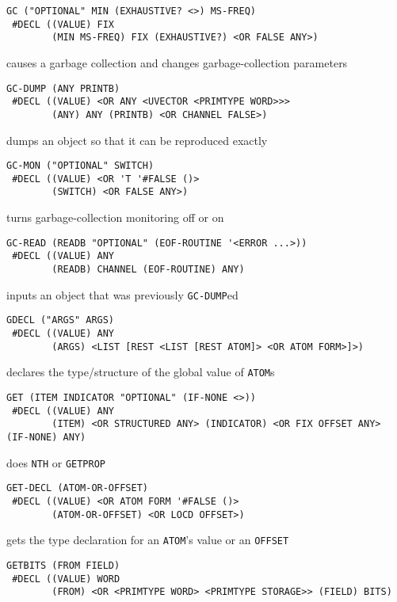 \documentclass[a4paper,]{article}
\begin{document}
\begin{verbatim}
GC ("OPTIONAL" MIN (EXHAUSTIVE? <>) MS-FREQ)
 #DECL ((VALUE) FIX
        (MIN MS-FREQ) FIX (EXHAUSTIVE?) <OR FALSE ANY>)
\end{verbatim}

causes a garbage collection and changes garbage-collection parameters

\begin{verbatim}
GC-DUMP (ANY PRINTB)
 #DECL ((VALUE) <OR ANY <UVECTOR <PRIMTYPE WORD>>>
        (ANY) ANY (PRINTB) <OR CHANNEL FALSE>)
\end{verbatim}

dumps an object so that it can be reproduced exactly

\begin{verbatim}
GC-MON ("OPTIONAL" SWITCH)
 #DECL ((VALUE) <OR 'T '#FALSE ()>
        (SWITCH) <OR FALSE ANY>)
\end{verbatim}

turns garbage-collection monitoring off or on

\begin{verbatim}
GC-READ (READB "OPTIONAL" (EOF-ROUTINE '<ERROR ...>))
 #DECL ((VALUE) ANY
        (READB) CHANNEL (EOF-ROUTINE) ANY)
\end{verbatim}

inputs an object that was previously \texttt{GC-DUMP}ed

\begin{verbatim}
GDECL ("ARGS" ARGS)
 #DECL ((VALUE) ANY
        (ARGS) <LIST [REST <LIST [REST ATOM]> <OR ATOM FORM>]>)
\end{verbatim}

declares the type/structure of the global value of \texttt{ATOM}s

\begin{verbatim}
GET (ITEM INDICATOR "OPTIONAL" (IF-NONE <>))
 #DECL ((VALUE) ANY
        (ITEM) <OR STRUCTURED ANY> (INDICATOR) <OR FIX OFFSET ANY> (IF-NONE) ANY)
\end{verbatim}

does \texttt{NTH} or \texttt{GETPROP}

\begin{verbatim}
GET-DECL (ATOM-OR-OFFSET)
 #DECL ((VALUE) <OR ATOM FORM '#FALSE ()>
        (ATOM-OR-OFFSET) <OR LOCD OFFSET>)
\end{verbatim}

gets the type declaration for an \texttt{ATOM}'s value or an \texttt{OFFSET}

\begin{verbatim}
GETBITS (FROM FIELD)
 #DECL ((VALUE) WORD
        (FROM) <OR <PRIMTYPE WORD> <PRIMTYPE STORAGE>> (FIELD) BITS)
\end{verbatim}
\end{document}
